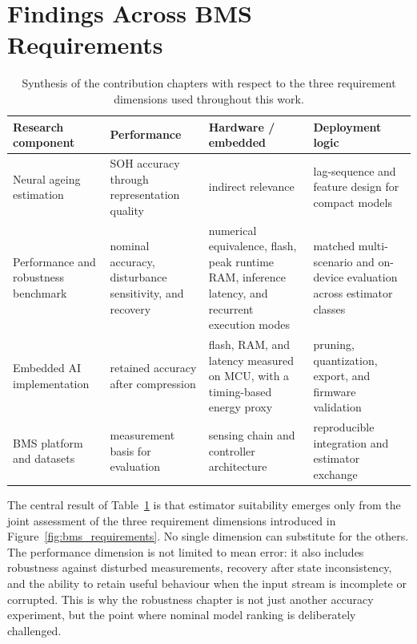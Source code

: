 \documentclass[
    a4paper,
    12pt,
    titlepage,
    bibliography=totoc,
    twoside=on,
    parskip=false,
    numbers=noenddot,
    cleardoublepage=empty,
    DIV=12,
    BCOR=12.0mm,
    headheight=36pt,
    headings=openright
]{scrreprt}
\begin{document}
\section{Findings Across BMS Requirements}
\begin{table}[H]
    \centering
    \small
    \caption[Synthesis of contribution chapters and requirement dimensions.]{Synthesis of the contribution chapters with respect to the three requirement dimensions used throughout this work.}
    \label{tab:synthesis_matrix}
    \begin{tabularx}{\textwidth}{>{\raggedright\arraybackslash}p{3.8cm}>{\raggedright\arraybackslash}p{2.7cm}>{\raggedright\arraybackslash}p{2.7cm}>{\raggedright\arraybackslash}X}
        \toprule
        Research component & Performance & Hardware / embedded & Deployment logic \\
        \midrule
        Neural ageing estimation & SOH accuracy through representation quality & indirect relevance & lag-sequence and feature design for compact models \\
        Performance and robustness benchmark & nominal accuracy, disturbance sensitivity, and recovery & numerical equivalence, flash, peak runtime RAM, inference latency, and recurrent execution modes & matched multi-scenario and on-device evaluation across estimator classes \\
        Embedded AI implementation & retained accuracy after compression & flash, RAM, and latency measured on MCU, with a timing-based energy proxy & pruning, quantization, export, and firmware validation \\
        BMS platform and datasets & measurement basis for evaluation & sensing chain and controller architecture & reproducible integration and estimator exchange \\
        \bottomrule
    \end{tabularx}
\end{table}

The central result of Table~\ref{tab:synthesis_matrix} is that estimator suitability emerges only from the joint assessment of the three requirement dimensions introduced in Figure~\ref{fig:bms_requirements}. No single dimension can substitute for the others. The performance dimension is not limited to mean error: it also includes robustness against disturbed measurements, recovery after state inconsistency, and the ability to retain useful behaviour when the input stream is incomplete or corrupted. This is why the robustness chapter is not just another accuracy experiment, but the point where nominal model ranking is deliberately challenged.
\end{document}
